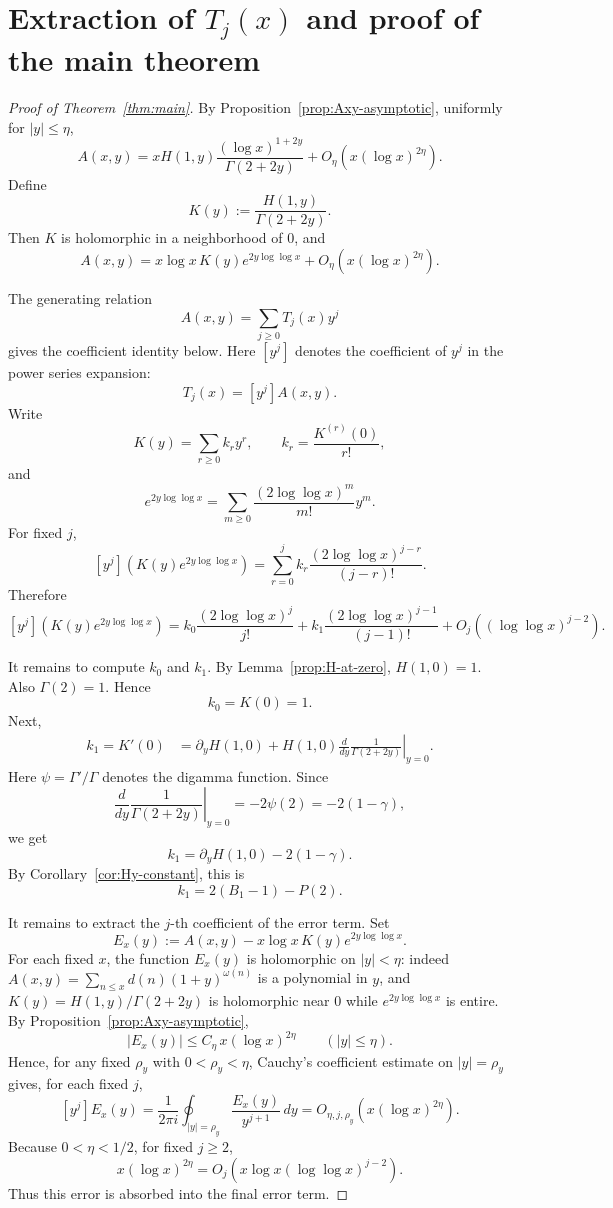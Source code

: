 \section{Extraction of \texorpdfstring{$T_j(x)$}{Tj(x)} and proof of the main theorem}\label{sec:extraction}

\begin{proof}[Proof of Theorem~\ref{thm:main}]
By Proposition~\ref{prop:Axy-asymptotic}, uniformly for
$|y|\leq\eta$,
\[
    A(x,y)
    =
    xH(1,y)
    \frac{(\log x)^{1+2y}}{\Gamma(2+2y)}
    +O_\eta\left(x(\log x)^{2\eta}\right).
\]
Define
\[
    K(y):=\frac{H(1,y)}{\Gamma(2+2y)}.
\]
Then $K$ is holomorphic in a neighborhood of $0$, and
\[
    A(x,y)
    =
    x\log x\, K(y)e^{2y\log\log x}
    +O_\eta\left(x(\log x)^{2\eta}\right).
\]

The generating relation
\[
    A(x,y)=\sum_{j\geq0}T_j(x)y^j
\]
gives the coefficient identity below. Here $[y^j]$ denotes the
coefficient of $y^j$ in the power series expansion:
\[
    T_j(x)=[y^j]A(x,y).
\]
Write
\[
    K(y)=\sum_{r\geq0}k_r y^r,
    \qquad
    k_r=\frac{K^{(r)}(0)}{r!},
\]
and
\[
    e^{2y\log\log x}
    =
    \sum_{m\geq0}
    \frac{(2\log\log x)^m}{m!}y^m.
\]
For fixed $j$,
\[
    [y^j]\left(K(y)e^{2y\log\log x}\right)
    =
    \sum_{r=0}^{j}
    k_r
    \frac{(2\log\log x)^{j-r}}{(j-r)!}.
\]
Therefore
\[
    [y^j]\left(K(y)e^{2y\log\log x}\right)
    =
    k_0\frac{(2\log\log x)^j}{j!}
    +
    k_1\frac{(2\log\log x)^{j-1}}{(j-1)!}
    +
    O_j\left((\log\log x)^{j-2}\right).
\]

It remains to compute $k_0$ and $k_1$. By
Lemma~\ref{prop:H-at-zero}, $H(1,0)=1$. Also $\Gamma(2)=1$.
Hence
\[
    k_0=K(0)=1.
\]
Next,
\[
\begin{aligned}
    k_1=K'(0)
    &=
    \partial_y H(1,0)
    +
    H(1,0)
    \left.
    \frac{d}{dy}\frac{1}{\Gamma(2+2y)}
    \right|_{y=0}.
\end{aligned}
\]
Here $\psi=\Gamma'/\Gamma$ denotes the digamma function. Since
\[
    \left.
    \frac{d}{dy}\frac{1}{\Gamma(2+2y)}
    \right|_{y=0}
    =
    -2\psi(2)
    =
    -2(1-\gamma),
\]
we get
\[
    k_1=\partial_y H(1,0)-2(1-\gamma).
\]
By Corollary~\ref{cor:Hy-constant}, this is
\[
    k_1=2(B_1-1)-P(2).
\]

It remains to extract the $j$-th coefficient of the error term. Set
\[
    E_x(y):=A(x,y)-x\log x\,K(y)e^{2y\log\log x}.
\]
For each fixed $x$, the function $E_x(y)$ is holomorphic on
$|y|<\eta$: indeed $A(x,y)=\sum_{n\leq x}d(n)(1+y)^{\omega(n)}$ is a
polynomial in $y$, and $K(y)=H(1,y)/\Gamma(2+2y)$ is holomorphic
near $0$ while $e^{2y\log\log x}$ is entire. By
Proposition~\ref{prop:Axy-asymptotic},
\[
    |E_x(y)|\leq C_\eta\,x(\log x)^{2\eta}
    \qquad(|y|\leq\eta).
\]
Hence, for any fixed $\rho_y$ with $0<\rho_y<\eta$, Cauchy's
coefficient estimate on $|y|=\rho_y$ gives, for each fixed $j$,
\[
    [y^j]E_x(y)
    =\frac{1}{2\pi i}\oint_{|y|=\rho_y}\frac{E_x(y)}{y^{j+1}}\,dy
    =O_{\eta,j,\rho_y}\left(x(\log x)^{2\eta}\right).
\]
Because $0<\eta<1/2$, for fixed $j\geq2$,
\[
    x(\log x)^{2\eta}
    =
    O_j\left(x\log x(\log\log x)^{j-2}\right).
\]
Thus this error is absorbed into the final error term.


\end{proof}
